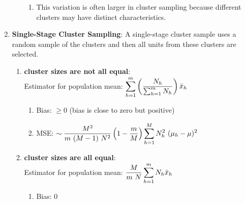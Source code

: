 \begin{enumerate}[itemsep=0.2cm]
\begin{enumerate}[itemsep=0.1cm]
\begin{enumerate}
            \item This variation is often larger in cluster sampling because different clusters may have distinct characteristics.
            \hfill \cite{common/online/chatgpt}

        \end{enumerate}
        
    \end{enumerate}

    \item \textbf{Single-Stage Cluster Sampling}\label{Sampling Plans/Representative Sampling/Cluster Sampling/Single-Stage Cluster Sampling}: A single-stage cluster sample uses a random sample of the clusters and then all units from these clusters are selected. 
    \hfill \cite{statistics/book/Statistics-for-Data-Scientists/Maurits-Kaptein}
    \begin{enumerate}
        \item \textbf{cluster sizes are not all equal}:
        \\
        Estimator for population mean: $
            \displaystyle\sum_{h=1}^{m}
            \left(
                \dfrac{N_h}{
                    \textstyle\sum_{h=1}^{m} N_h
                }
            \right)
            \bar{x}_h
        $
        \hfill \cite{statistics/book/Statistics-for-Data-Scientists/Maurits-Kaptein}
        \begin{enumerate}[itemsep=0.25cm]
            \item Bias: $\geq 0$ (bias is close to zero but positive)
            \hfill \cite{statistics/book/Statistics-for-Data-Scientists/Maurits-Kaptein}
    
            \item MSE: $
                \sim 
                \dfrac{M^2}{m\ (M-1)\ N^2}
                \left(1 - \dfrac{m}{M}\right)
                \displaystyle\sum_{h=1}^M N_h^2\ (\mu_h - \mu)^2
            $
            \hfill \cite{statistics/book/Statistics-for-Data-Scientists/Maurits-Kaptein}
        \end{enumerate}


        \item \textbf{cluster sizes are all equal}:
        \\
        Estimator for population mean: $
            \dfrac{M}{m\ N}
            \dsum_{h=1}^{m}
            N_h \bar{x}_h
        $
        \hfill \cite{statistics/book/Statistics-for-Data-Scientists/Maurits-Kaptein}
        \begin{enumerate}[itemsep=0.25cm]
            \item Bias: $0$
            \hfill \cite{statistics/book/Statistics-for-Data-Scientists/Maurits-Kaptein}
    

\end{enumerate}
\end{enumerate}
\end{enumerate}
